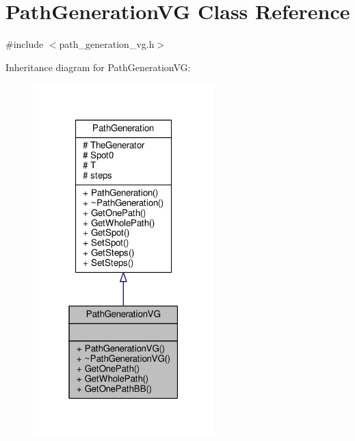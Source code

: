 \hypertarget{classPathGenerationVG}{}\section{Path\+Generation\+VG Class Reference}
\label{classPathGenerationVG}


{\ttfamily \#include $<$path\+\_\+generation\+\_\+vg.\+h$>$}



Inheritance diagram for Path\+Generation\+VG\+:
\nopagebreak
\begin{figure}[H]
\begin{center}
\leavevmode
\includegraphics[width=199pt]{classPathGenerationVG__inherit__graph}
\end{center}
\end{figure}


